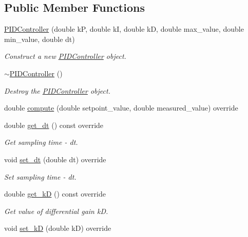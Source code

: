 \subsection*{Public Member Functions}
\begin{DoxyCompactItemize}
\item 
\hyperlink{classPIDController_aba84b9949f9e74bf038cc0a5a7ad7c67}{P\+I\+D\+Controller} (double kP, double kI, double kD, double max\+\_\+value, double min\+\_\+value, double dt)
\begin{DoxyCompactList}\small\item\em Construct a new \hyperlink{classPIDController}{P\+I\+D\+Controller} object. \end{DoxyCompactList}\item 
\mbox{\label{classPIDController_a690e7ad4796e5c5143aa4b90f2f6677b}} 
\hyperlink{classPIDController_a690e7ad4796e5c5143aa4b90f2f6677b}{$\sim$\+P\+I\+D\+Controller} ()
\begin{DoxyCompactList}\small\item\em Destroy the \hyperlink{classPIDController}{P\+I\+D\+Controller} object. \end{DoxyCompactList}\item 
double \hyperlink{classPIDController_a0b57631654b460a4668f01b7cc0c8ecb}{compute} (double setpoint\+\_\+value, double measured\+\_\+value) override
\item 
double \hyperlink{classPIDController_a338490568fd2de02c4e1eea130a816c1}{get\+\_\+dt} () const override
\begin{DoxyCompactList}\small\item\em Get sampling time -\/ dt. \end{DoxyCompactList}\item 
void \hyperlink{classPIDController_a04c753e2ff22f62017f82e0e4143493b}{set\+\_\+dt} (double dt) override
\begin{DoxyCompactList}\small\item\em Set sampling time -\/ dt. \end{DoxyCompactList}\item 
double \hyperlink{classPIDController_a0f366ed8608947fa17454682773a48ee}{get\+\_\+kD} () const override
\begin{DoxyCompactList}\small\item\em Get value of differential gain kD. \end{DoxyCompactList}\item 
void \hyperlink{classPIDController_a88adb39de00d22b72a8a33716fc1c117}{set\+\_\+kD} (double kD) override

\end{DoxyCompactItemize}
